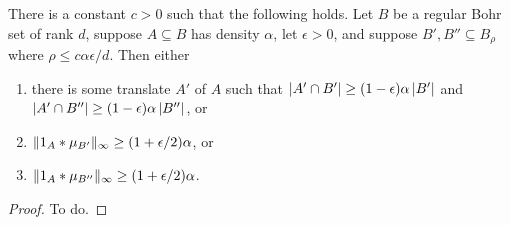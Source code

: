 \begin{lemma}
\label{bourgain-trick}
There is a constant $c>0$ such that the following holds. Let $B$ be a regular Bohr set of rank $d$, suppose $A\subseteq B$ has density $\alpha$, let $\epsilon>0$, and suppose $B',B''\subseteq B_\rho$ where $\rho\leq c\alpha\epsilon/d$. Then either
\begin{enumerate}
\item there is some translate $A'$ of $A$ such that $\left\lvert A'\cap B'\right\rvert\geq (1-\epsilon)\alpha\left\lvert B'\right\rvert$ and $\left\lvert A'\cap B''\right\rvert\geq (1-\epsilon)\alpha \left\lvert B''\right\rvert$, or
\item $\lVert 1_{A}\ast \mu_{B'}\rVert_\infty\geq (1+\epsilon/2)\alpha$, or
\item $\lVert 1_{A}\ast \mu_{B''}\rVert_\infty \geq (1+\epsilon/2)\alpha$.
\end{enumerate}
\end{lemma}
\begin{proof}
To do.
\end{proof}

